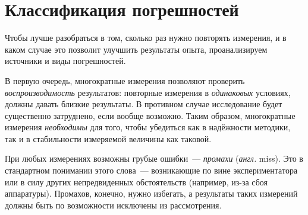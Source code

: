 \enlargethispage{1em}



\section{Классификация погрешностей}

Чтобы лучше разобраться в том, сколько раз нужно повторять измерения,
и в каком случае это позволит улучшить результаты опыта,
проанализируем источники и виды погрешностей.

В первую очередь, многократные измерения позволяют проверить
\emph{воспроизводимость} результатов: повторные измерения в \emph{одинаковых}
условиях, должны давать близкие результаты. В противном случае
исследование будет существенно затруднено, если вообще возможно.
Таким образом, многократные измерения \emph{необходимы} для того,
чтобы убедиться как в надёжности методики, так и в стабильности измеряемой
величины как таковой.

При любых измерениях возможны грубые ошибки~--- \emph{промахи}
(\emph{англ.} miss). Это  в стандартном
понимании этого слова~--- возникающие по вине экспериментатора
или в силу других непредвиденных обстоятельств (например, из-за сбоя
аппаратуры). Промахов, конечно, нужно избегать, а результаты таких
измерений должны быть по возможности исключены из рассмотрения.

